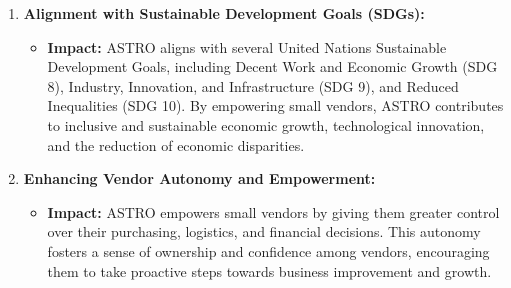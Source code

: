 \begin{enumerate}
		\item \textbf{Alignment with Sustainable Development Goals (SDGs):}
		\begin{itemize}
			\item \textbf{Impact:} ASTRO aligns with several United Nations Sustainable Development Goals, including Decent Work and Economic Growth (SDG 8), Industry, Innovation, and Infrastructure (SDG 9), and Reduced Inequalities (SDG 10). By empowering small vendors, ASTRO contributes to inclusive and sustainable economic growth, technological innovation, and the reduction of economic disparities.
		\end{itemize}
		
		\item \textbf{Enhancing Vendor Autonomy and Empowerment:}
		\begin{itemize}
			\item \textbf{Impact:} ASTRO empowers small vendors by giving them greater control over their purchasing, logistics, and financial decisions. This autonomy fosters a sense of ownership and confidence among vendors, encouraging them to take proactive steps towards business improvement and growth.
		\end{itemize}
	\end{enumerate}	
	